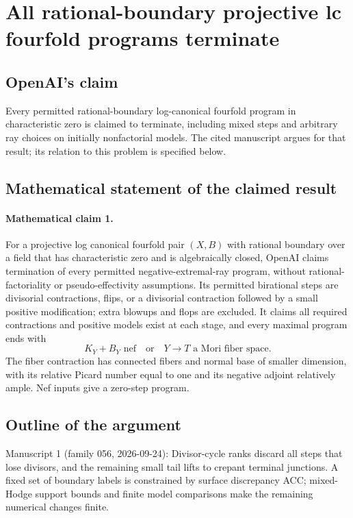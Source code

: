 \documentclass[11pt]{article}
\begin{document}
\section*{All rational-boundary projective lc fourfold programs terminate}

\subsection{OpenAI's claim}
Every permitted rational-boundary log-canonical fourfold program in characteristic zero is claimed to terminate, including mixed steps and arbitrary ray choices on initially nonfactorial models. The cited manuscript argues for that result; its relation to this problem is specified below.

\subsection{Mathematical statement of the claimed result}
\paragraph{Mathematical claim 1.} For a projective log canonical fourfold pair $(X,B)$ with rational boundary over a field that has characteristic zero and is algebraically closed, OpenAI claims termination of every permitted negative-extremal-ray program, without rational-factoriality or pseudo-effectivity assumptions. Its permitted birational steps are divisorial contractions, flips, or a divisorial contraction followed by a small positive modification; extra blowups and flops are excluded. It claims all required contractions and positive models exist at each stage, and every maximal program ends with
\[
K_Y+B_Y\text{ nef}\quad\text{or}\quad Y\to T\text{ a Mori fiber space}.
\]
The fiber contraction has connected fibers and normal base of smaller dimension, with its relative Picard number equal to one and its negative adjoint relatively ample. Nef inputs give a zero-step program.

\subsection{Outline of the argument}
Manuscript 1 (family 056, 2026-09-24): Divisor-cycle ranks discard all steps that lose divisors, and the remaining small tail lifts to crepant terminal junctions. A fixed set of boundary labels is constrained by surface discrepancy ACC; mixed-Hodge support bounds and finite model comparisons make the remaining numerical changes finite.
\end{document}

